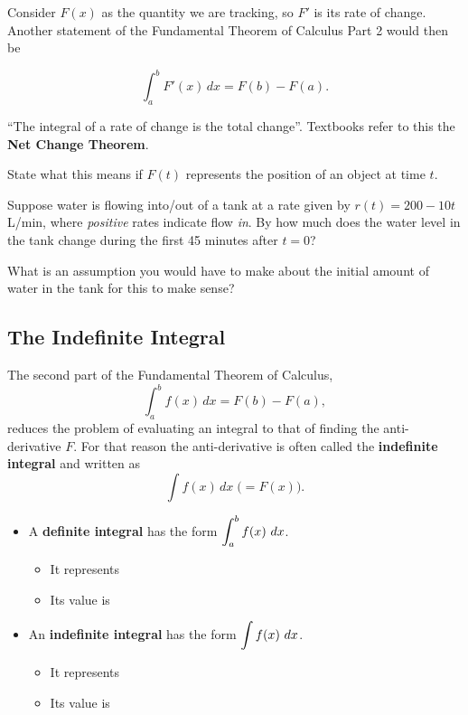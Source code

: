 Consider $F(x)$ as the quantity we are tracking, so $F'$ is its rate
of change.  Another statement of the Fundamental Theorem of Calculus
Part 2 would then be

\begin{boxnote} \label{thm:netchange}
\[ \int_a^bF'(x)\,dx=F(b)-F(a).
\]
\end{boxnote}

``The integral of a rate of change is the total change''.  Textbooks
refer to this the {\bf Net Change Theorem}.  \bigskip

\problem State what this means if $F(t)$ represents the position of an
object at time $t$.


\newpage

\begin{problem}
  Suppose water is flowing into/out of a tank at a rate given by $r(t)
  = 200 -10t$ L/min, where {\em positive} rates indicate flow {\em
    in}.  By how much does the water level in the tank change during
  the first 45 minutes after $t=0$?   
\end{problem}

\newpage

\problem What is an assumption you would have to make about the
  initial amount of water in the tank for this to make sense?



\newpage

\subsection*{The Indefinite Integral}
The second part of the Fundamental Theorem of Calculus,
$$\int_a^b f(x)\,dx = F(b)-F(a),$$ reduces the problem of evaluating
an integral to that of finding the anti-derivative $F$.  For that
reason the anti-derivative is often called the {\bf indefinite
  integral} and written as $$\int f(x)\,dx\;\biggl(=F(x)\biggr).$$

\newpage
\begin{itemize}
\item A {\bf definite integral} has the form $\displaystyle \int_a^b f(x) ~dx$.
  \begin{itemize}
  \item It represents 
\vfill
  \item Its value is  
\vfill
  \end{itemize}
\vfill
\item An {\bf indefinite integral} has the form $\displaystyle \int f(x) ~dx$.
  \begin{itemize}
  \item It represents 
\vfill
  \item Its value is 
\vfill 
  \end{itemize}
\end{itemize}

